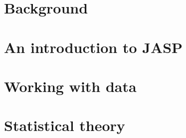 







\pagestyle{plain}

\maketitle %





\part{Background}





\part{An introduction to JASP}



\part{Working with data}





\part{Statistical theory}




%


